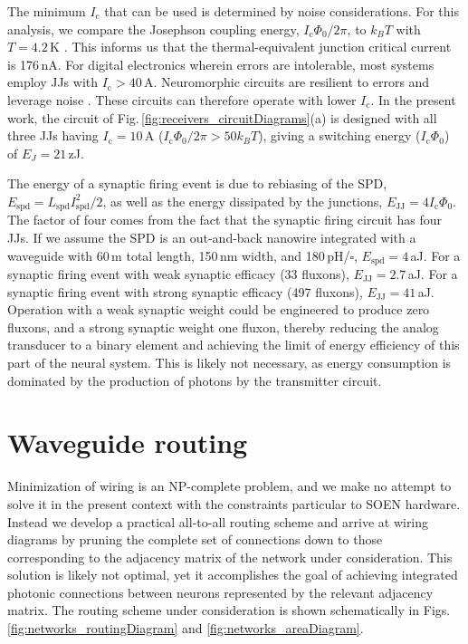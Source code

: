 \documentclass[aip,amsmath,amssymb,reprint,nofootinbib]{revtex4-1}
\begin{document}
The minimum $I_{\mathrm{c}}$ that can be used is determined by noise considerations. For this analysis, we compare the Josephson coupling energy, $I_{\mathrm{c}}\Phi_0/2\pi$, to $k_B T$ with $T = 4.2$\,K \cite{lise1991}. This informs us that the thermal-equivalent junction critical current is 176\,nA. For digital electronics wherein errors are intolerable, most systems employ JJs with $I_{\mathrm{c}} > 40$\,\textmu A. Neuromorphic circuits are resilient to errors and leverage noise \cite{vrso1996,vora2005,stgo2005}. These circuits can therefore operate with lower $I_{\mathrm{c}}$. In the present work, the circuit of Fig.\,\ref{fig:receivers_circuitDiagrams}(a) is designed with all three JJs having $I_{\mathrm{c}} = 10$\,\textmu A ($I_{\mathrm{c}}\Phi_0/2\pi > 50 k_B T$), giving a switching energy ($I_{\mathrm{c}}\Phi_0$) of $E_{J} = 21$\,zJ.

The energy of a synaptic firing event is due to rebiasing of the SPD, $E_{\mathrm{spd}} = L_{\mathrm{spd}}I_{\mathrm{spd}}^2/2$, as well as the energy dissipated by the junctions, $E_{\mathrm{JJ}} = 4I_{\mathrm{c}}\Phi_0$. The factor of four comes from the fact that the synaptic firing circuit has four JJs. If we assume the SPD is an out-and-back nanowire integrated with a waveguide \cite{spga2011,pesc2012,feka2015,shbu2017b} with 60\,\textmu m total length, 150\,nm width, and 180\,pH/$\square$, $E_{\mathrm{spd}} = 4$\,aJ. For a synaptic firing event with weak synaptic efficacy (33 fluxons), $E_{\mathrm{JJ}} = 2.7$\,aJ. For a synaptic firing event with strong synaptic efficacy (497 fluxons), $E_{\mathrm{JJ}} = 41$\,aJ. Operation with a weak synaptic weight could be engineered to produce zero fluxons, and a strong synaptic weight one fluxon, thereby reducing the analog transducer to a binary element and achieving the limit of energy efficiency of this part of the neural system. This is likely not necessary, as energy consumption is dominated by the production of photons by the transmitter circuit.
	
\section{\label{apx:sectorRouting}Waveguide routing}
Minimization of wiring is an NP-complete problem, and we make no attempt to solve it in the present context with the constraints particular to SOEN hardware. Instead we develop a practical all-to-all routing scheme and arrive at wiring diagrams by pruning the complete set of connections down to those corresponding to the adjacency matrix of the network under consideration. This solution is likely not optimal, yet it accomplishes the goal of achieving integrated photonic connections between neurons represented by the relevant adjacency matrix. The routing scheme under consideration is shown schematically in Figs.\,\ref{fig:networks_routingDiagram} and \ref{fig:networks_areaDiagram}.
\end{document}
